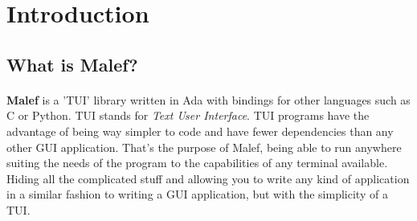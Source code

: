 
\section {Introduction}
   \subsection {What is Malef?}
   \paragraph{}
      \textbf {Malef} is a 'TUI' library written in Ada with bindings for other
   languages such as C or Python. TUI stands for \textit{Text User Interface}.
   TUI programs have the advantage of being way simpler to code and have fewer
   dependencies than any other GUI application. That's the purpose of Malef,
   being able to run anywhere suiting the needs of the program to the
   capabilities of any terminal available. Hiding all the complicated stuff and
   allowing you to write any kind of application in a similar fashion to
   writing a GUI application, but with the simplicity of a TUI.

